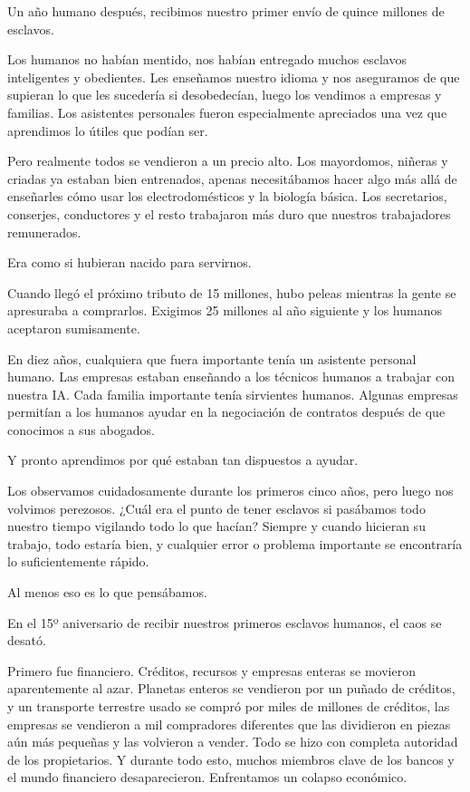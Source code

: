 \documentclass[spanish,12pt,a4paper,oneside,titlepage]{book}
\begin{document}
    Un año humano después, recibimos nuestro primer envío de quince millones de esclavos.

    Los humanos no habían mentido, nos habían entregado muchos esclavos inteligentes y obedientes. Les enseñamos nuestro idioma y nos aseguramos de que supieran lo que les sucedería si desobedecían, luego los vendimos a empresas y familias. Los asistentes personales fueron especialmente apreciados una vez que aprendimos lo útiles que podían ser.

    Pero realmente todos se vendieron a un precio alto. Los mayordomos, niñeras y criadas ya estaban bien entrenados, apenas necesitábamos hacer algo más allá de enseñarles cómo usar los electrodomésticos y la biología básica. Los secretarios, conserjes, conductores y el resto trabajaron más duro que nuestros trabajadores remunerados.

    Era como si hubieran nacido para servirnos.

    Cuando llegó el próximo tributo de 15 millones, hubo peleas mientras la gente se apresuraba a comprarlos. Exigimos 25 millones al año siguiente y los humanos aceptaron sumisamente.

    En diez años, cualquiera que fuera importante tenía un asistente personal humano. Las empresas estaban enseñando a los técnicos humanos a trabajar con nuestra IA. Cada familia importante tenía sirvientes humanos. Algunas empresas permitían a los humanos ayudar en la negociación de contratos después de que conocimos a sus abogados.

    Y pronto aprendimos por qué estaban tan dispuestos a ayudar.

    Los observamos cuidadosamente durante los primeros cinco años, pero luego nos volvimos perezosos. ¿Cuál era el punto de tener esclavos si pasábamos todo nuestro tiempo vigilando todo lo que hacían? Siempre y cuando hicieran su trabajo, todo estaría bien, y cualquier error o problema importante se encontraría lo suficientemente rápido.

    Al menos eso es lo que pensábamos.

    En el 15º aniversario de recibir nuestros primeros esclavos humanos, el caos se desató.

    Primero fue financiero. Créditos, recursos y empresas enteras se movieron aparentemente al azar. Planetas enteros se vendieron por un puñado de créditos, y un transporte terrestre usado se compró por miles de millones de créditos, las empresas se vendieron a mil compradores diferentes que las dividieron en piezas aún más pequeñas y las volvieron a vender. Todo se hizo con completa autoridad de los propietarios. Y durante todo esto, muchos miembros clave de los bancos y el mundo financiero desaparecieron. Enfrentamos un colapso económico.
\end{document}
